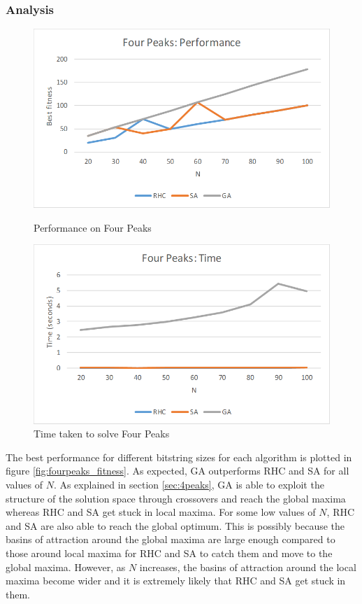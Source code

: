 \documentclass[letterpaper]{article}
\begin{document}
	\subsubsection{Analysis}
	\begin{figure}
		\centering
		\begin{minipage}{.5\textwidth}
			\centering
			\includegraphics[width=\linewidth]{../plots/fourpeaks_fitness}
			\caption{Performance on Four Peaks}
			\label{fig:fourpeaks_fitness}
		\end{minipage}%
		\begin{minipage}{.5\textwidth}
			\centering
			\includegraphics[width=\linewidth]{../plots/fourpeaks_time}
			\caption{Time taken to solve Four Peaks}
			\label{fig:fourpeaks_time}			
		\end{minipage}
	\end{figure}
	The best performance for different bitstring sizes for each algorithm is plotted in figure \ref{fig:fourpeaks_fitness}. As expected, GA outperforms RHC and SA for all values of $N$. As explained in section \ref{sec:4peaks}, GA is able to exploit the structure of the solution space through crossovers and reach the global maxima whereas RHC and SA get stuck in local maxima. For some low values of $N$, RHC and SA are also able to reach the global optimum. This is possibly because the basins of attraction around the global maxima are large enough compared to those around local maxima for RHC and SA to catch them and move to the global maxima. However, as $N$ increases, the basins of attraction around the local maxima become wider and it is extremely likely that RHC and SA get stuck in them.
	
\end{document}
